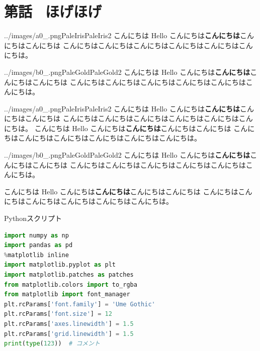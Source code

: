 \documentclass[b5paper,xelatex,ja=standard,11pt]{bxjsarticle}
\begin{document}
\begin{spacing}{1.1}\textbf{\tableofcontents}\end{spacing}

\renewcommand*{\mysectiontitle}{第{\themycounter}話 \, ほげほげ}
\section*{\mysectiontitle}\addcontentsline{toc}{section}{\mysectiontitle}

\begin{SERIFU}[enlarge top by=3pt]{../images/a0_.png}{PaleIris}{PaleIris2}
こんにちは Hello こんにちは{\bf こんにちは}こんにちはこんにちは
こんにちはこんにちはこんにちはこんにちはこんにちはこんにちは。
\end{SERIFU}

\begin{SERIFU}{../images/b0_.png}{PaleGold}{PaleGold2}
こんにちは Hello こんにちは{\bf こんにちは}こんにちはこんにちは
こんにちはこんにちはこんにちはこんにちはこんにちはこんにちは。
\end{SERIFU}

\begin{SERIFU}{../images/a0_.png}{PaleIris}{PaleIris2}
こんにちは Hello こんにちは{\bf こんにちは}こんにちはこんにちは
こんにちはこんにちはこんにちはこんにちはこんにちはこんにちは。
こんにちは Hello こんにちは{\bf こんにちは}こんにちはこんにちは
こんにちはこんにちはこんにちはこんにちはこんにちはこんにちは。
\end{SERIFU}

\begin{SERIFU}[enlarge bottom by=2pt]{../images/b0_.png}{PaleGold}{PaleGold2}
こんにちは Hello こんにちは{\bf こんにちは}こんにちはこんにちは
こんにちはこんにちはこんにちはこんにちはこんにちはこんにちは。
\end{SERIFU}

こんにちは Hello こんにちは{\bf こんにちは}こんにちはこんにちは
こんにちはこんにちはこんにちはこんにちはこんにちはこんにちは。

\begin{CODE}[]{Pythonスクリプト}
\begin{lstlisting}[language=python]
import numpy as np
import pandas as pd
%matplotlib inline  
import matplotlib.pyplot as plt
import matplotlib.patches as patches
from matplotlib.colors import to_rgba
from matplotlib import font_manager
plt.rcParams['font.family'] = 'Ume Gothic'
plt.rcParams['font.size'] = 12
plt.rcParams['axes.linewidth'] = 1.5
plt.rcParams['grid.linewidth'] = 1.5
print(type(123))  # コメント
\end{lstlisting}
\end{CODE}
\end{document}
